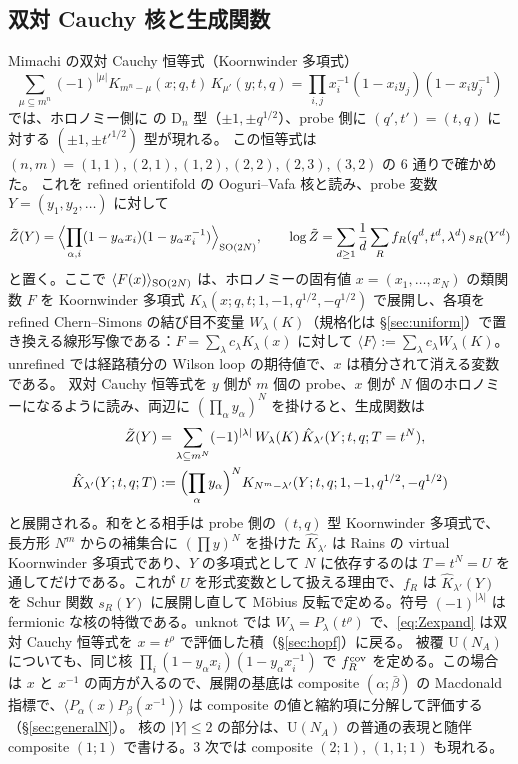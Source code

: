 \subsection{双対 Cauchy 核と生成関数}
Mimachi の双対 Cauchy 恒等式（Koornwinder 多項式）
\[
\sum_{\mu \subseteq m^n} (-1)^{|\mu|} K_{m^n - \mu}(x; q, t)\, K_{\mu'}(y; t, q) = \prod_{i, j} x_i^{-1}(1 - x_i y_j)(1 - x_i y_j^{-1})
\]
では、ホロノミー側に \cite{AgSc12} の D$_n$ 型（$\pm1, \pm q^{1/2}$）、probe 側に $(q', t') = (t, q)$ に対する $(\pm 1, \pm t'^{1/2})$ 型が現れる。
この恒等式は $(n, m) = (1,1), (2,1), (1,2), (2,2), (2,3), (3,2)$ の 6 通りで確かめた。
これを refined orientifold の Ooguri--Vafa 核と読み、probe 変数 $Y = (y_1, y_2, \dots)$ に対して
\begin{equation}\label{eq:Z}
\tilde Z(Y) = \Bigl\langle \prod_{\alpha, i} (1 - y_\alpha x_i)(1 - y_\alpha x_i^{-1}) \Bigr\rangle_{\mathrm{SO}(2N)},\qquad
\log \tilde Z = \sum_{d \ge 1} \frac1d \sum_R f_R(q^d, t^d, \lambda^d)\, s_R(Y^d)
\end{equation}
と置く。ここで $\langle F(x)\rangle_{\mathrm{SO}(2N)}$ は、ホロノミーの固有値 $x = (x_1, \dots, x_N)$ の類関数 $F$ を Koornwinder 多項式 $K_\lambda(x; q, t; 1, -1, q^{1/2}, -q^{1/2})$ で展開し、各項を refined Chern--Simons の結び目不変量 $W_\lambda(K)$（規格化は \S\ref{sec:uniform}）で置き換える線形写像である：$F = \sum_\lambda c_\lambda K_\lambda(x)$ に対して $\langle F\rangle := \sum_\lambda c_\lambda W_\lambda(K)$。unrefined では経路積分の Wilson loop の期待値で、$x$ は積分されて消える変数である。
双対 Cauchy 恒等式を $y$ 側が $m$ 個の probe、$x$ 側が $N$ 個のホロノミーになるように読み、両辺に $(\prod_\alpha y_\alpha)^N$ を掛けると、生成関数は
\begin{equation}\label{eq:Zexpand}
\begin{aligned}
\tilde Z(Y) &= \sum_{\lambda \subseteq m^N} (-1)^{|\lambda|}\, W_\lambda(K)\, \hat K_{\lambda'}(Y; t, q; T = t^N),\\
\hat K_{\lambda'}(Y; t, q; T) &:= \Bigl(\prod_\alpha y_\alpha\Bigr)^N K_{N^m - \lambda'}(Y; t, q; 1, -1, q^{1/2}, -q^{1/2})
\end{aligned}
\end{equation}
と展開される。和をとる相手は probe 側の $(t, q)$ 型 Koornwinder 多項式で、長方形 $N^m$ からの補集合に $(\prod y)^N$ を掛けた $\hat K_{\lambda'}$ は Rains の virtual Koornwinder 多項式であり、$Y$ の多項式として $N$ に依存するのは $T = t^N = U$ を通してだけである。これが $U$ を形式変数として扱える理由で、$f_R$ は $\hat K_{\lambda'}(Y)$ を Schur 関数 $s_R(Y)$ に展開し直して Möbius 反転で定める。符号 $(-1)^{|\lambda|}$ は fermionic な核の特徴である。unknot では $W_\lambda = P_\lambda(t^\rho)$ で、\eqref{eq:Zexpand} は双対 Cauchy 恒等式を $x = t^\rho$ で評価した積（\S\ref{sec:hopf}）に戻る。
被覆 U$(N_A)$ についても、同じ核 $\prod_i(1 - y_\alpha x_i)(1 - y_\alpha x_i^{-1})$ で $f^{\mathrm{cov}}_R$ を定める。この場合は $x$ と $x^{-1}$ の両方が入るので、展開の基底は composite $(\alpha; \bar\beta)$ の Macdonald 指標で、$\langle P_\alpha(x) P_\beta(x^{-1})\rangle$ は composite の値と縮約項に分解して評価する（\S\ref{sec:generalN}）。
核の $|Y| \le 2$ の部分は、U$(N_A)$ の普通の表現と随伴 composite $(1;1)$ で書ける。3 次では composite $(2;1)$, $(1,1;1)$ も現れる。

